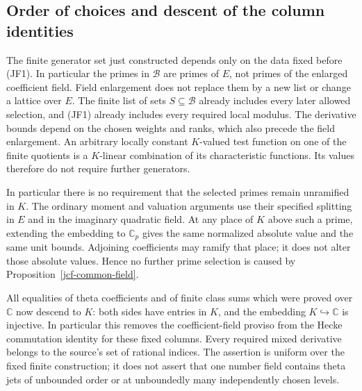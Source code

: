 \subsection{Order of choices and descent of the column identities}

The finite generator set just constructed depends only on
the data fixed before (JF1). In particular the primes in
$\mathcal B$ are primes of $E$, not primes of the enlarged
coefficient field. Field enlargement does not replace them
by a new list or change a lattice over $E$. The finite list
of sets $S\subseteq\mathcal B$ already includes every later
allowed selection, and (JF1) already includes every required
local modulus. The derivative bounds depend on the chosen
weights and ranks, which also precede the field enlargement.
An arbitrary locally constant $K$-valued test function on
one of the finite quotients is a $K$-linear combination of
its characteristic functions. Its values therefore do not
require further generators.

In particular there is no requirement that the selected
primes remain unramified in $K$. The ordinary moment and
valuation arguments use their specified splitting in $E$
and in the imaginary quadratic field. At any place of $K$
above such a prime, extending the embedding to $\mathbb C_p$
gives the same normalized absolute value and the same unit
bounds. Adjoining coefficients may ramify that place; it
does not alter those absolute values. Hence no further
prime selection is caused by Proposition~\ref{jcf-common-field}.

All equalities of theta coefficients and of finite class
sums which were proved over $\mathbb C$ now descend to $K$:
both sides have entries in $K$, and the embedding
$K\hookrightarrow\mathbb C$ is injective. In particular
this removes the coefficient-field proviso from the Hecke
commutation identity for these fixed columns. Every
required mixed derivative belongs to the source's set of
rational indices. The assertion is uniform over the fixed
finite construction; it does not assert that one number
field contains theta jets of unbounded order or at
unboundedly many independently chosen levels.


